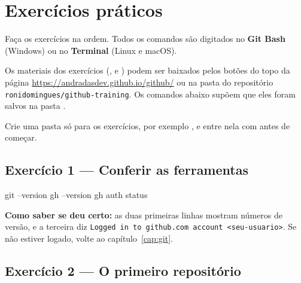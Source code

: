 \chapter{Exercícios práticos}
\label{cap:exercicios}

Faça os exercícios na ordem. Todos os comandos são digitados no \textbf{Git
Bash} (Windows) ou no \textbf{Terminal} (Linux e macOS).

Os materiais dos exercícios (,  e
) podem ser baixados pelos botões do topo da página
\url{https://andradasdev.github.io/github/} ou na pasta  do
repositório \texttt{ronidomingues/github-training}. Os comandos abaixo supõem que eles foram
salvos na pasta .

\begin{dica}
Crie uma pasta só para os exercícios, por exemplo ,
e entre nela com  antes de começar.
\end{dica}

\section{Exercício 1 — Conferir as ferramentas}

\begin{bashcode}
git --version
gh --version
gh auth status
\end{bashcode}

\textbf{Como saber se deu certo:} as duas primeiras linhas mostram números de
versão, e a terceira diz \texttt{Logged in to github.com account
<seu-usuario>}. Se não estiver logado, volte ao capítulo~\ref{cap:git}.

\section{Exercício 2 — O primeiro repositório}

